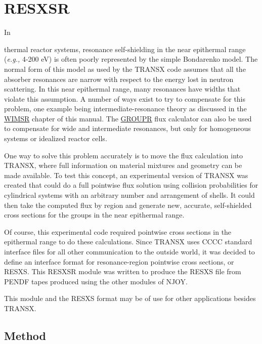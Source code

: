 \section{RESXSR}
\label{sRESXSR}

\hypertarget{sRESXSRhy}{In}
thermal reactor systems, resonance self-shielding in the
near epithermal range ({\it e.g.,} 4-200 eV) is often poorly
represented by the simple Bondarenko model\cite{Bondarenko}.
The normal form of this model as used by the TRANSX code\cite{TRANSX2}
assumes that all the absorber resonances are narrow with respect
to the energy lost in neutron scattering.  In this near epithermal
range, many resonances have widths that violate this assumption.
A number of ways exist to try to compensate for this problem, one
example being intermediate-resonance theory as discussed in
the \hyperlink{sWIMSRhy}{WIMSR} chapter of this
manual.  The \hyperlink{sGROUPRhy}{GROUPR}
flux calculator can also
be used to compensate for wide and intermediate resonances, but
only for homogeneous systems or idealized reactor cells.

One way to solve this problem accurately is to move the flux
calculation into TRANSX, where full information on material
mixtures and geometry can be made available.  To test
this concept, an experimental version of TRANSX was created
that could do a full pointwise flux solution using collision
probabilities for cylindrical systems with an arbitrary number
and arrangement of shells.  It could then take the computed
flux by region and generate new, accurate, self-shielded cross
sections for the groups in the near epithermal range.

Of course, this experimental code required pointwise cross
sections in the epithermal range to do these calculations.  Since
TRANSX uses CCCC standard interface files\cite{CCCC4} for all other
communication to the outside world, it was decided to define an
interface format for resonance-region pointwise cross sections, or
RESXS.  This RESXSR module was written to produce the RESXS file
from PENDF tapes produced using the other modules of NJOY.

This module and the RESXS format may be of use for other applications
besides TRANSX.

\subsection{Method}
\label{ssRESXSR_method}

